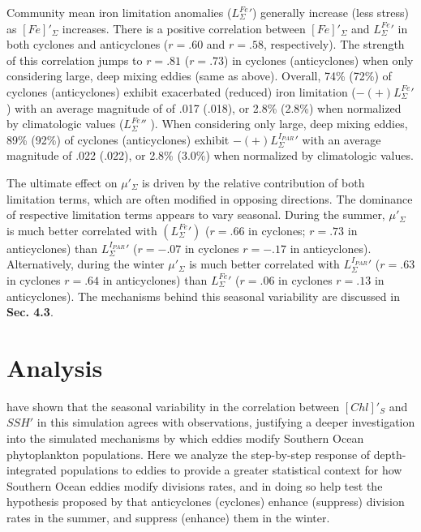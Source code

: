 Community mean iron limitation anomalies ($L_\Sigma^{Fe}'$) generally increase (less stress) as $[Fe]'_\Sigma$ increases. There is a positive correlation between $[Fe]'_\Sigma$ and $L_\Sigma^{Fe}'$ in both cyclones and anticyclones ($r=.60$ and $r=.58$, respectively). The strength of this correlation jumps to $r=.81$ ($r=.73$) in cyclones (anticyclones) when only considering large, deep mixing eddies (same as above). Overall, 74\% (72\%) of cyclones (anticyclones) exhibit exacerbated (reduced) iron limitation ($-(+)L_\Sigma^{Fe}'$) with an average magnitude of of .017 (.018), or 2.8\% (2.8\%) when normalized by climatologic values ($L_\Sigma^{Fe}''$ ). When considering only large, deep mixing eddies,  89\% (92\%) of cyclones (anticyclones) exhibit $-(+)L_\Sigma^{I_{PAR}}'$ with an average magnitude of .022 (.022), or 2.8\% (3.0\%) when normalized by climatologic values.


The ultimate effect on $\mu'_\Sigma$ is driven by the relative contribution of both limitation terms, which are often modified in opposing directions. The dominance of respective limitation terms appears to vary seasonal. During the summer,  $\mu'_\Sigma$ is much better correlated with $(L_\Sigma^{Fe}')$ ($r=.66$ in cyclones; $r=.73$ in anticyclones) than $L_\Sigma^{I_{PAR}}'$ ($r=-.07$ in cyclones $r=-.17$ in anticyclones). Alternatively, during the winter  $\mu'_\Sigma$ is much better correlated with $L_\Sigma^{I_{PAR}}'$ ($r=.63$ in cyclones $r=.64$ in anticyclones) than $L_\Sigma^{Fe}'$ ($r=.06$ in cyclones $r=.13$ in anticyclones). The mechanisms behind this seasonal variability are discussed in \textbf{Sec. 4.3}.





\section{Analysis}

\textcite{SongSeasonalvariationcorrelation2018} have shown that the seasonal variability in the correlation between $[Chl]'_S$ and $SSH'$ in this simulation agrees with observations, justifying a deeper investigation into the simulated mechanisms by which eddies modify Southern Ocean phytoplankton populations. Here we analyze the step-by-step response of depth-integrated populations to eddies to provide a greater statistical context for how Southern Ocean eddies modify divisions rates, and in doing so help test the hypothesis proposed by \textcite{SongSeasonalvariationcorrelation2018} that anticyclones (cyclones) enhance (suppress) division rates in the summer, and suppress (enhance) them in the winter.

